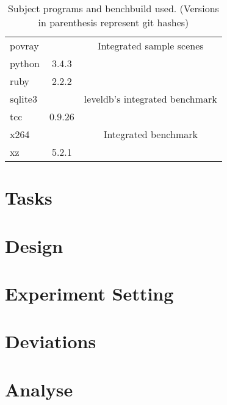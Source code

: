 \begin{table}[H]
\begin{tabularx}{\textwidth}{XcC}
        povray &  & Integrated sample scenes\\
        python & 3.4.3\\
        ruby & 2.2.2\\
        sqlite3 &  & leveldb's integrated benchmark\\
        tcc & 0.9.26\\
        x264 &  & Integrated benchmark\\
        xz & 5.2.1\\
        \bottomrule
    \end{tabularx}
    \caption[Subject programs]{Subject programs and benchbuild used. (Versions in parenthesis represent git hashes)}
\end{table}

\section{Tasks}

\section{Design}

\section{Experiment Setting}

\section{Deviations}

\section{Analyse}

